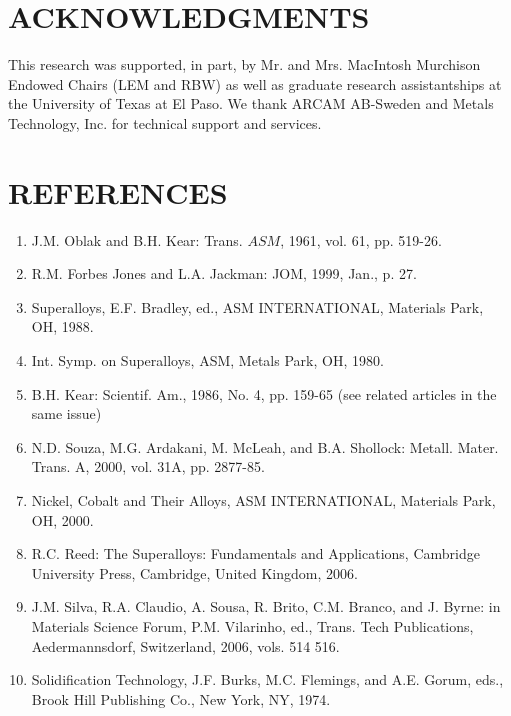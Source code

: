 \documentclass[10pt]{article}
\begin{document}
\section*{ACKNOWLEDGMENTS}
This research was supported, in part, by $\mathrm{Mr}$. and Mrs. MacIntosh Murchison Endowed Chairs (LEM and RBW) as well as graduate research assistantships at the University of Texas at El Paso. We thank ARCAM AB-Sweden and Metals Technology, Inc. for technical support and services.

\section*{REFERENCES}
\begin{enumerate}
  \item J.M. Oblak and B.H. Kear: Trans. $A S M$, 1961, vol. 61, pp. 519-26.

  \item R.M. Forbes Jones and L.A. Jackman: JOM, 1999, Jan., p. 27.

  \item Superalloys, E.F. Bradley, ed., ASM INTERNATIONAL, Materials Park, OH, 1988.

  \item Int. Symp. on Superalloys, ASM, Metals Park, OH, 1980.

  \item B.H. Kear: Scientif. Am., 1986, No. 4, pp. 159-65 (see related articles in the same issue)

  \item N.D. Souza, M.G. Ardakani, M. McLeah, and B.A. Shollock: Metall. Mater. Trans. A, 2000, vol. 31A, pp. 2877-85.

  \item Nickel, Cobalt and Their Alloys, ASM INTERNATIONAL, Materials Park, OH, 2000.

  \item R.C. Reed: The Superalloys: Fundamentals and Applications, Cambridge University Press, Cambridge, United Kingdom, 2006.

  \item J.M. Silva, R.A. Claudio, A. Sousa, R. Brito, C.M. Branco, and J. Byrne: in Materials Science Forum, P.M. Vilarinho, ed., Trans. Tech Publications, Aedermannsdorf, Switzerland, 2006, vols. 514 516.

  \item Solidification Technology, J.F. Burks, M.C. Flemings, and A.E. Gorum, eds., Brook Hill Publishing Co., New York, NY, 1974.


\end{enumerate}
\end{document}
